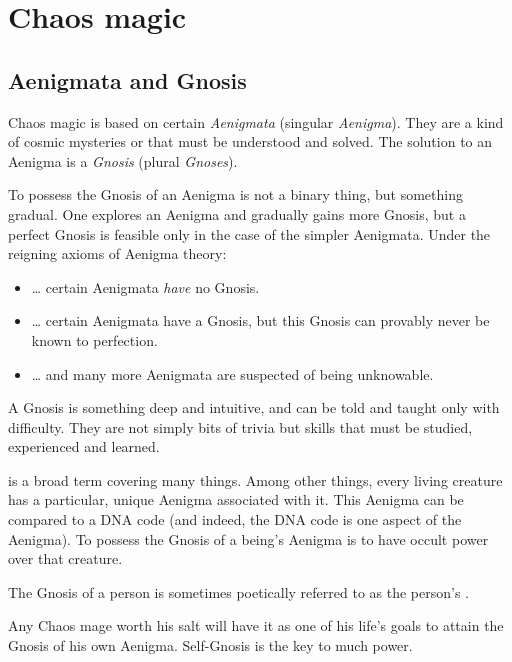 \section{Chaos magic}




\subsection{Aenigmata and Gnosis}
Chaos magic is based on certain \emph{Aenigmata} (singular \emph{Aenigma}). 
They are a kind of cosmic mysteries or  that must be understood and solved. 
The solution to an Aenigma is a \emph{Gnosis} (plural \emph{Gnoses}). 

To possess the Gnosis of an Aenigma is not a binary thing, but something gradual. 
One explores an Aenigma and gradually gains more Gnosis, but a perfect Gnosis is feasible only in the case of the simpler Aenigmata. 
Under the reigning axioms of Aenigma theory: 
\begin{itemize}
  \item \ldots{} certain Aenigmata \emph{have} no Gnosis. 
  \item \ldots{} certain Aenigmata have a Gnosis, but this Gnosis can provably never be known to perfection. 
  \item \ldots{} and many more Aenigmata are suspected of being unknowable. 
\end{itemize}

A Gnosis is something deep and intuitive, and can be told and taught only with difficulty. 
They are not simply bits of trivia but skills that must be studied, experienced and learned. 

 is a broad term covering many things. 
Among other things, every living creature has a particular, unique Aenigma associated with it. 
This Aenigma can be compared to a DNA code (and indeed, the DNA code is one aspect of the Aenigma). 
To possess the Gnosis of a being's Aenigma is to have occult power over that creature. 

The Gnosis of a person is sometimes poetically referred to as the person's . 

Any Chaos mage worth his salt will have it as one of his life's goals to attain the Gnosis of his own Aenigma. 
Self-Gnosis is the key to much power. 

